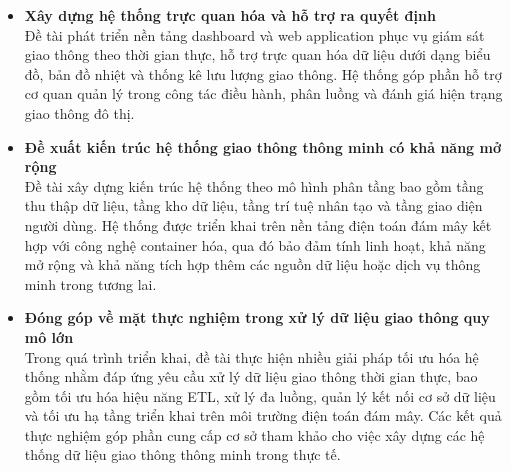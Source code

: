 \begin{itemize}
    \item \textbf{Xây dựng hệ thống trực quan hóa và hỗ trợ ra quyết định}\\
    Đề tài phát triển nền tảng dashboard và web application phục vụ giám sát giao thông theo thời gian thực, hỗ trợ trực quan hóa dữ liệu dưới dạng biểu đồ, bản đồ nhiệt và thống kê lưu lượng giao thông. Hệ thống góp phần hỗ trợ cơ quan quản lý trong công tác điều hành, phân luồng và đánh giá hiện trạng giao thông đô thị.

    \item \textbf{Đề xuất kiến trúc hệ thống giao thông thông minh có khả năng mở rộng}\\
    Đề tài xây dựng kiến trúc hệ thống theo mô hình phân tầng bao gồm tầng thu thập dữ liệu, tầng kho dữ liệu, tầng trí tuệ nhân tạo và tầng giao diện người dùng. Hệ thống được triển khai trên nền tảng điện toán đám mây kết hợp với công nghệ container hóa, qua đó bảo đảm tính linh hoạt, khả năng mở rộng và khả năng tích hợp thêm các nguồn dữ liệu hoặc dịch vụ thông minh trong tương lai.

    \item \textbf{Đóng góp về mặt thực nghiệm trong xử lý dữ liệu giao thông quy mô lớn}\\
    Trong quá trình triển khai, đề tài thực hiện nhiều giải pháp tối ưu hóa hệ thống nhằm đáp ứng yêu cầu xử lý dữ liệu giao thông thời gian thực, bao gồm tối ưu hóa hiệu năng ETL, xử lý đa luồng, quản lý kết nối cơ sở dữ liệu và tối ưu hạ tầng triển khai trên môi trường điện toán đám mây. Các kết quả thực nghiệm góp phần cung cấp cơ sở tham khảo cho việc xây dựng các hệ thống dữ liệu giao thông thông minh trong thực tế.

\end{itemize}
